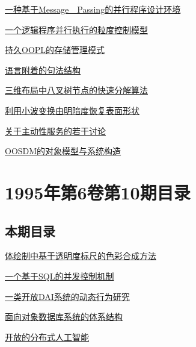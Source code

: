 \documentclass[a4paper]{article}
\begin{document}
\href{http://www.jos.org.cn/ch/reader/download_pdf.aspx?file_no=19951102&year_id=1995&quarter_id=11&falg=1}{一种基于Message　Passing的并行程序设计环境}

\href{http://www.jos.org.cn/ch/reader/download_pdf.aspx?file_no=19951103&year_id=1995&quarter_id=11&falg=1}{一个逻辑程序并行执行的粒度控制模型}

\href{http://www.jos.org.cn/ch/reader/download_pdf.aspx?file_no=19951104&year_id=1995&quarter_id=11&falg=1}{持久OOPL的存储管理模式}

\href{http://www.jos.org.cn/ch/reader/download_pdf.aspx?file_no=19951105&year_id=1995&quarter_id=11&falg=1}{语言附着的句法结构}

\href{http://www.jos.org.cn/ch/reader/download_pdf.aspx?file_no=19951106&year_id=1995&quarter_id=11&falg=1}{三维布局中八叉树节点的快速分解算法}

\href{http://www.jos.org.cn/ch/reader/download_pdf.aspx?file_no=19951107&year_id=1995&quarter_id=11&falg=1}{利用小波变换由明暗度恢复表面形状}

\href{http://www.jos.org.cn/ch/reader/download_pdf.aspx?file_no=19951108&year_id=1995&quarter_id=11&falg=1}{关于主动性服务的若干讨论}

\href{http://www.jos.org.cn/ch/reader/download_pdf.aspx?file_no=19951109&year_id=1995&quarter_id=11&falg=1}{OOSDM的对象模型与系统构造}


\section{\textbf{1995年第6卷第10期目录}}
\subsection{本期目录}
\href{http://www.jos.org.cn/ch/reader/download_pdf.aspx?file_no=19951001&year_id=1995&quarter_id=10&falg=1}{体绘制中基于透明度标尺的色彩合成方法}

\href{http://www.jos.org.cn/ch/reader/download_pdf.aspx?file_no=19951002&year_id=1995&quarter_id=10&falg=1}{一个基于SQL的并发控制机制}

\href{http://www.jos.org.cn/ch/reader/download_pdf.aspx?file_no=19951003&year_id=1995&quarter_id=10&falg=1}{一类开放DAI系统的动态行为研究}

\href{http://www.jos.org.cn/ch/reader/download_pdf.aspx?file_no=19951004&year_id=1995&quarter_id=10&falg=1}{面向对象数据库系统的体系结构}

\href{http://www.jos.org.cn/ch/reader/download_pdf.aspx?file_no=19951005&year_id=1995&quarter_id=10&falg=1}{开放的分布式人工智能}
\end{document}
